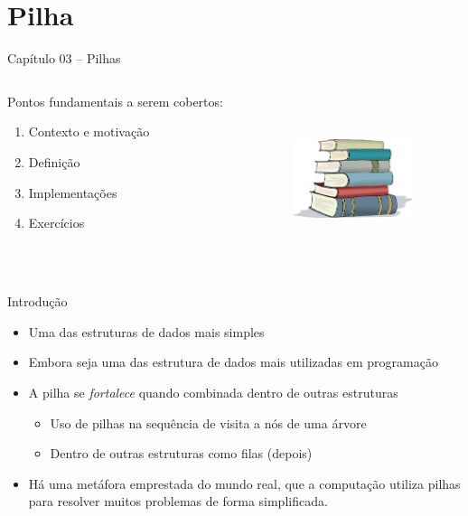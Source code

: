 

\section{Pilha}

\begin{frame}[c]{\Large Capítulo 03 -- Pilhas}


\begin{columns}
\begin{column}{.5\textwidth}
\centering
Pontos fundamentais a serem cobertos:
  \begin{enumerate}
  \item Contexto e motivação
  \item Definição
  \item Implementações
  \item Exercícios 
\end{enumerate}  

\end{column}
\begin{column}{.5\textwidth}
\centering
\includegraphics[height=5cm, width=3.5cm]{figs/fig_pilhas/pilha_livro.jpeg}
\end{column}
\end{columns}

\end{frame}

  \begin{frame}{Introdução}    
		\begin{itemize}
			\item Uma das estruturas de dados mais simples
			\item Embora seja uma das estrutura de dados mais utilizadas em programação
			\item A pilha se \textit{fortalece} quando combinada dentro de outras estruturas
			\begin{itemize}
			  \item Uso de pilhas na sequência de visita a nós de uma árvore
			  \item Dentro de outras estruturas como filas (depois)
			\end{itemize}
			
			\item Há uma metáfora emprestada do mundo real, que a 
			computação utiliza pilhas 
			para resolver muitos problemas de forma simplificada.
		\end{itemize}
  \end{frame}
  
